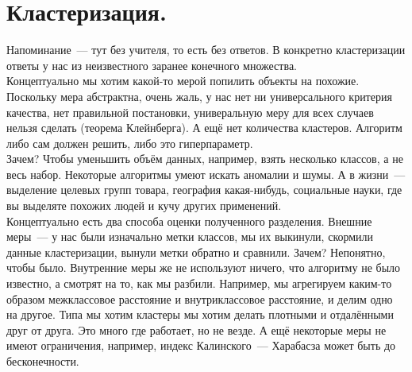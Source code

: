 \documentclass{article}
\begin{document}
    \section{Кластеризация.}
    Напоминание~--- тут без учителя, то есть без ответов. В конкретно кластеризации ответы у нас из неизвестного заранее конечного множества.\\
    Концептуально мы хотим какой-то мерой попилить объекты на похожие.\\
    Поскольку мера абстрактна, очень жаль, у нас нет ни универсального критерия качества, нет правильной постановки, универальную меру для всех случаев нельзя сделать (теорема Клейнберга). А ещё нет количества кластеров. Алгоритм либо сам должен решить, либо это гиперпараметр.\\
    Зачем? Чтобы уменьшить объём данных, например, взять несколько классов, а не весь набор. Некоторые алгоритмы умеют искать аномалии и шумы. А в жизни~--- выделение целевых групп товара, география какая-нибудь, социальные науки, где вы выделяте похожих людей и кучу других применений.\\
    Концептуально есть два способа оценки полученного разделения. Внешние меры~--- у нас были изначально метки классов, мы их выкинули, скормили данные кластеризации, вынули метки обратно и сравнили. Зачем? Непонятно, чтобы было. Внутренние меры же не используют ничего, что алгоритму не было известно, а смотрят на то, как мы разбили. Например, мы агрегируем каким-то образом межклассовое расстояние и внутриклассовое расстояние, и делим одно на другое. Типа мы хотим кластеры мы хотим делать плотными и отдалёнными друг от друга. Это много где работает, но не везде. А ещё некоторые меры не имеют ограничения, например, индекс Калинского~--- Харабасза может быть до бесконечности.
\end{document}
